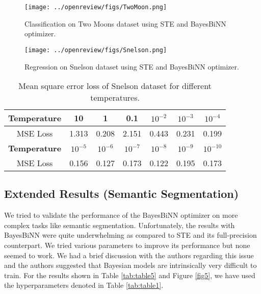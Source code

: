 \begin{figure}[h]
     \centering
         \texttt{[image: ../openreview/figs/TwoMoon.png]}
         \caption{Classification on Two Moons dataset using STE and BayesBiNN optimizer.}
         \label{fig3}
\end{figure}

\begin{figure}[h]
     \centering
         \texttt{[image: ../openreview/figs/Snelson.png]}
         \caption{Regression on Snelson dataset using STE and BayesBiNN optimizer.}
         \label{fig4}
\end{figure}


\begin{table}[h]
\begin{center}
\setlength{\tabcolsep}{12pt}
\renewcommand{\arraystretch}{1.3}
\begin{tabular}{ | c | c | c | c | c | c | c | }
\hline
 \textbf{Temperature} & 10 & 1 & 0.1 & $10^{-2}$ & $10^{-3}$ & $10^{-4}$ \\\hline
 MSE Loss & 1.313 & 0.208 & 2.151 & 0.443 & 0.231 & 0.199\\ \hline
 \textbf{Temperature} & $10^{-5}$ & $10^{-6}$ & $10^{-7}$ & $10^{-8}$ & $10^{-9}$ & $10^{-10}$\\  \hline
 MSE Loss & 0.156 & 0.127 & 0.173 & 0.122 & 0.195 & 0.173\\ 
\hline
\end{tabular}
\caption{Mean square error loss of Snelson dataset for different temperatures.}
\label{tab:Ablation_result_4}

\end{center}
\end{table}

\subsection{Extended Results (Semantic Segmentation)}
We tried to validate the performance of the BayesBiNN optimizer on more complex tasks like semantic segmentation. Unfortunately, the results with BayesBiNN were quite underwhelming as compared to STE and its full-precision counterpart. We tried various parameters to improve its performance but none seemed to work. We had a brief discussion with the authors regarding this issue and the authors suggested that Bayesian models are intrinsically very difficult to train. For the results shown in Table \autoref{tab:table5} and Figure \autoref{fig5}, we have used the hyperparameters denoted in Table \autoref{tab:table1}.

